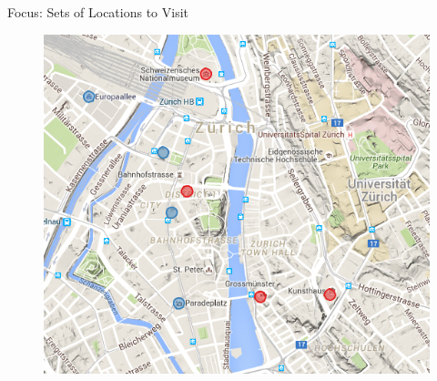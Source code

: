 \documentclass{beamer}
\begin{document}
\begin{frame}{Focus: Sets of Locations to Visit}
  \begin{figure}
    \centering
    \includegraphics[scale=0.45]{sets_1}
  \end{figure}
\end{frame}
\end{document}
